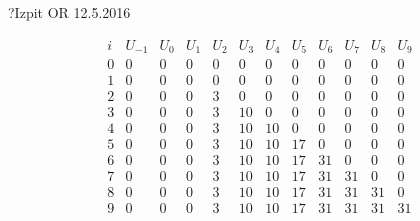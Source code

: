 \begin{naloga}{?}{Izpit OR 12.5.2016}
\begin{odgovor}
\begin{tabela}
$$
\begin{array}{c|ccccccccccc}
i & U_{-1} & U_0 & U_1 & U_2 & U_3 & U_4 & U_5 & U_6 & U_7 & U_8 & U_9 \\ \hline
0 & 0 & 0 & 0 & 0 & 0 & 0 & 0 & 0 & 0 & 0 & 0 \\
1 & 0 & 0 & 0 & 0 & 0 & 0 & 0 & 0 & 0 & 0 & 0 \\
2 & 0 & 0 & 0 & 3 & 0 & 0 & 0 & 0 & 0 & 0 & 0 \\
3 & 0 & 0 & 0 & 3 & 10 & 0 & 0 & 0 & 0 & 0 & 0 \\
4 & 0 & 0 & 0 & 3 & 10 & 10 & 0 & 0 & 0 & 0 & 0 \\
5 & 0 & 0 & 0 & 3 & 10 & 10 & 17 & 0 & 0 & 0 & 0 \\
6 & 0 & 0 & 0 & 3 & 10 & 10 & 17 & 31 & 0 & 0 & 0 \\
7 & 0 & 0 & 0 & 3 & 10 & 10 & 17 & 31 & 31 & 0 & 0 \\
8 & 0 & 0 & 0 & 3 & 10 & 10 & 17 & 31 & 31 & 31 & 0 \\
9 & 0 & 0 & 0 & 3 & 10 & 10 & 17 & 31 & 31 & 31 & 31
\end{array}
$$
\end{tabela}

\end{odgovor}
\end{naloga}
